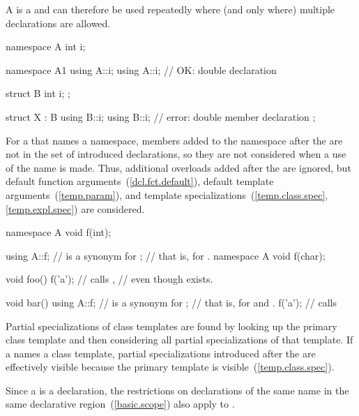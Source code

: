 \pnum
A  is a  and can
therefore be used repeatedly where (and only where) multiple
declarations are allowed.
\enterexample

\begin{codeblock}
namespace A {
  int i;
}

namespace A1 {
  using A::i;
  using A::i;       // OK: double declaration
}

struct B {
  int i;
};

struct X : B {
  using B::i;
  using B::i;       // error: double member declaration
};
\end{codeblock}
\exitexample

\pnum
\enternote
For a  that names a namespace,
members added to the namespace after the 
are not in the set of introduced declarations, so they are not
considered when a use of the name is made. Thus, additional
overloads added after the  are ignored, but
default function arguments~(\ref{dcl.fct.default}), default template
arguments~(\ref{temp.param}), and template specializations~(\ref{temp.class.spec},
\ref{temp.expl.spec}) are considered. \exitnote
\enterexample

\begin{codeblock}
namespace A {
  void f(int);
}

using A::f;         //  is a synonym for ;
                    // that is, for .
namespace A {
  void f(char);
}

void foo() {
  f('a');           // calls ,
}                   // even though  exists.

void bar() {
  using A::f;       //  is a synonym for ;
                    // that is, for  and .
  f('a');           // calls 
}
\end{codeblock}
\exitexample

\pnum
\enternote
Partial specializations of class templates are found by looking up the
primary class template and then considering all partial specializations
of that template. If a  names a class
template, partial specializations introduced after the
 are effectively visible because the primary
template is visible~(\ref{temp.class.spec}).
\exitnote

\pnum
Since a  is a declaration, the restrictions
on declarations of the same name in the same declarative
region~(\ref{basic.scope}) also apply to .
\enterexample

